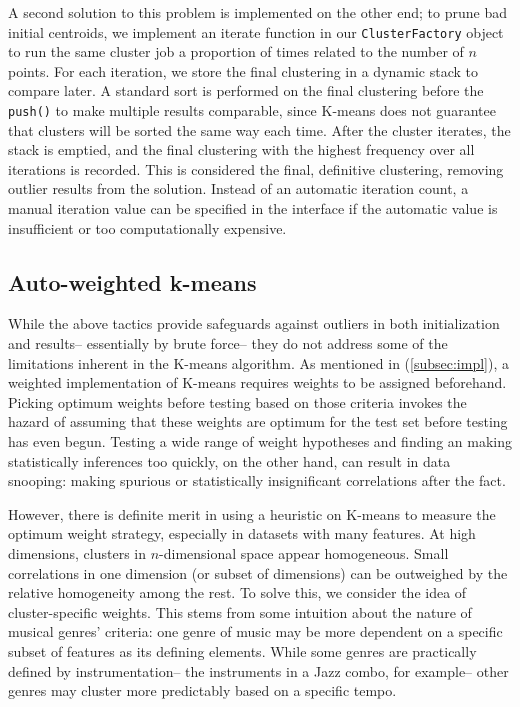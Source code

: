 \documentclass[12pt,twocolumn,titlepage]{article}
\begin{document}
A second solution to this problem is implemented on the other end; to prune bad initial centroids, we implement an iterate function in our \texttt{ClusterFactory} object to run the same cluster job a proportion of times related to the number of $n$ points. For each iteration, we store the final clustering in a dynamic stack to compare later. A standard sort is performed on the final clustering before the \texttt{push()} to make multiple results comparable, since K-means does not guarantee that clusters will be sorted the same way each time. After the cluster iterates, the stack is emptied, and the final clustering with the highest frequency over all iterations is recorded. This is considered the final, definitive clustering, removing outlier results from the solution. Instead of an automatic iteration count, a manual iteration value can be specified in the interface if the automatic value is insufficient or too computationally expensive.

\subsection{Auto-weighted k-means}

While the above tactics provide safeguards against outliers in both initialization and results-- essentially by brute force-- they do not address some of the limitations inherent in the K-means algorithm. As mentioned in (\ref{subsec:impl}), a weighted implementation of K-means requires weights to be assigned beforehand. Picking optimum weights before testing based on those criteria invokes the hazard of assuming that these weights are optimum for the test set before testing has even begun. Testing a wide range of weight hypotheses and finding an making statistically inferences too quickly, on the other hand, can result in data snooping: making spurious or statistically insignificant correlations after the fact.


However, there is definite merit in using a heuristic on K-means to measure the optimum weight strategy, especially in datasets with many features. At high dimensions, clusters in $n$-dimensional space appear homogeneous. \cite{KumarErtoz} Small correlations in one dimension (or subset of dimensions) can be outweighed by the relative homogeneity among the rest. To solve this, we consider the idea of cluster-specific weights. This stems from some intuition about the nature of musical genres' criteria: one genre of music may be more dependent on a specific subset of features as its defining elements. While some genres are practically defined by instrumentation-- the instruments in a Jazz combo, for example-- other genres may cluster more predictably based on a specific tempo. 
\end{document}

